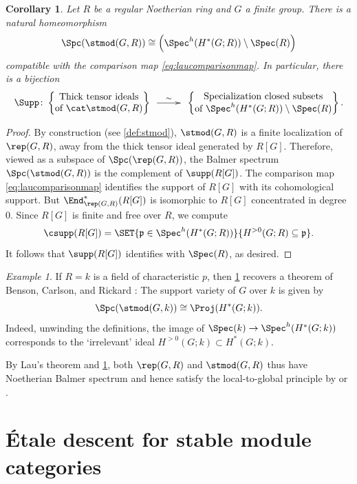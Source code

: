 \documentclass{amsart}%
\numberwithin{equation}{section}%
\newtheorem{Cor}[equation]{Corollary}
\theoremstyle{remark}
\newtheorem{Exa}[equation]{Example}
\begin{document}
\begin{Cor}\label{cor:spcstmod}
Let $R$ be a regular Noetherian ring and $G$ a finite group. There is a natural homeomorphism
\[
\Spc(\stmod(G,R)) \cong \left(\Spec^h(H^*(G;R))\setminus\Spec(R)\right)
\]
compatible with the comparison map \eqref{eq:laucomparisonmap}. In particular, there is a bijection
\[
\Supp\colon
\begin{Bmatrix}
\text{Thick tensor ideals} \\
\text{of } \cat \stmod(G, R)
\end{Bmatrix} 
\xymatrix@C=2pc{ \ar[r]^-{\sim} &}
\begin{Bmatrix}
\text{Specialization closed subsets}  \\
\text{of }\Spec^h(H^*(G; R))\setminus\Spec(R)
\end{Bmatrix}.
\]
\end{Cor}
\begin{proof}
By construction (see \cref{def:stmod}), $\stmod(G,R)$ is a finite localization of $\rep(G,R)$, away from the thick tensor ideal generated by $R[G]$. Therefore, viewed as a subspace of $\Spc(\rep(G,R))$, the Balmer spectrum $\Spc(\stmod(G,R))$ is the complement of $\supp(R[G])$. The comparison map \eqref{eq:laucomparisonmap} identifies the support of $R[G]$ with its cohomological support. But $\End_{\rep(G,R)}^*(R[G])$ is isomorphic to $R[G]$ concentrated in degree $0$. Since $R[G]$ is finite and free over $R$, we compute
\[
\csupp(R[G]) = \SET{\frak p \in \Spec^h(H^*(G;R))}{H^{>0}(G;R) \subseteq \frak p}. 
\]
It follows that $\supp(R[G])$ identifies with $\Spec(R)$, as desired.
\end{proof}

\begin{Exa}\label{ex:bcr}
If $R=k$ is a field of characteristic $p$, then \cref{cor:spcstmod} recovers a theorem of Benson, Carlson, and Rickard \cite{BensonCarlsonRickard97}: The support variety of $G$ over $k$ is given by 
\[
\Spc(\stmod(G,k)) \cong \Proj(H^*(G;k)).
\]
Indeed, unwinding the definitions, the image of $\Spec(k) \to \Spec^h(H^*(G;k))$ corresponds to the `irrelevant' ideal $H^{>0}(G;k) \subset H^{*}(G;k)$.
\end{Exa}

By Lau's theorem and \cref{cor:spcstmod}, both $\rep(G,R)$ and $\stmod(G,R)$ thus have Noetherian Balmer spectrum and hence satisfy the local-to-global principle by \cite[Thm.~6.9]{Stevenson13} or \cite[Thm.~3.21]{bhs1}.


\section{\'Etale descent for stable module categories}
\end{document}
